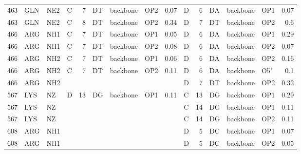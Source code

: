 \begin{longtable}{rlllrlllrlrlllr}
       463 & GLN        & NE2    & C         &           7 & DT           & backbone    & OP2      &          0.07 & D         &           6 & DA           & backbone    & OP1      &          0.07 \\
       463 & GLN        & NE2    & C         &           8 & DT           & backbone    & OP2      &          0.34 & D         &           7 & DT           & backbone    & OP2      &          0.6  \\
       466 & ARG        & NH1    & C         &           7 & DT           & backbone    & OP1      &          0.05 & D         &           6 & DA           & backbone    & OP1      &          0.29 \\
       466 & ARG        & NH1    & C         &           7 & DT           & backbone    & OP2      &          0.08 & D         &           6 & DA           & backbone    & OP2      &          0.07 \\
       466 & ARG        & NH2    & C         &           7 & DT           & backbone    & OP1      &          0.06 & D         &           6 & DA           & backbone    & OP2      &          0.16 \\
       466 & ARG        & NH2    & C         &           7 & DT           & backbone    & OP2      &          0.11 & D         &           6 & DA           & backbone    & O5'      &          0.1  \\
       466 & ARG        & NH2    &        &          &           &          &       &            & D         &           7 & DT           & backbone    & OP2      &          0.32 \\
       567 & LYS        & NZ     & D         &          13 & DG           & backbone    & OP1      &          0.11 & C         &          13 & DG           & backbone    & OP1      &          0.29 \\
       567 & LYS        & NZ     &        &          &           &          &       &            & C         &          14 & DG           & backbone    & OP1      &          0.11 \\
       567 & LYS        & NZ     &        &          &           &          &       &            & C         &          14 & DG           & backbone    & OP2      &          0.11 \\
       608 & ARG        & NH1    &        &          &           &          &       &            & D         &           5 & DC           & backbone    & OP1      &          0.07 \\
       608 & ARG        & NH1    &        &          &           &          &       &            & D         &           5 & DC           & backbone    & OP2      &          0.05 \\

\end{longtable}
